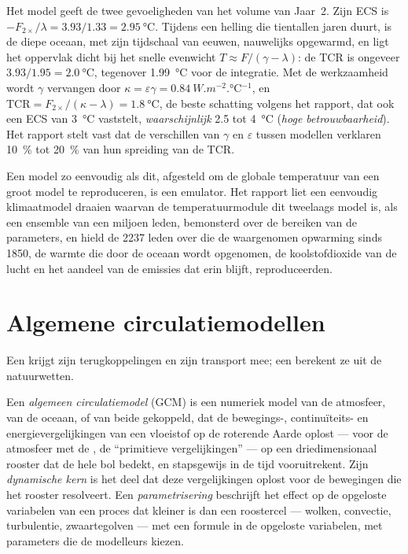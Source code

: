 Het model geeft de twee gevoeligheden van het volume van Jaar~2. Zijn ECS is
$-F_{2\times}/\lambda = 3.93/1.33 = \qty{2.95}{\celsius}$. Tijdens een helling
die tientallen jaren duurt, is de diepe oceaan, met zijn tijdschaal van eeuwen, nauwelijks
opgewarmd, en ligt het oppervlak dicht bij het snelle evenwicht $T \approx F/(\gamma -
\lambda)$: de TCR is ongeveer $3.93/1.95 = \qty{2.0}{\celsius}$, tegenover
\qty{1.99}{\celsius} voor de integratie. Met de werkzaamheid wordt $\gamma$ vervangen
door $\kappa = \varepsilon\gamma = \qty{0.84}{W.m^{-2}.\celsius^{-1}}$,
en $\text{TCR} = F_{2\times}/(\kappa - \lambda) = \qty{1.8}{\celsius}$,
de beste schatting volgens het rapport, dat ook een ECS van
\qty{3}{\celsius} vaststelt, \emph{waarschijnlijk} 2.5 tot \qty{4}{\celsius} (\emph{hoge
betrouwbaarheid}). Het rapport stelt vast dat de verschillen van $\gamma$ en
$\varepsilon$ tussen modellen verklaren \qty{10}{\percent} tot \qty{20}{\percent} van hun
spreiding van de TCR.

Een model zo eenvoudig als dit, afgesteld om de globale temperatuur van een groot
model te reproduceren, is een emulator. Het rapport liet een eenvoudig klimaatmodel draaien waarvan de temperatuurmodule
dit tweelaags model is, als een ensemble van een miljoen leden, bemonsterd over de
bereiken van de parameters, en hield de 2237 leden over die de waargenomen
opwarming sinds 1850, de warmte die door de oceaan wordt opgenomen, de
koolstofdioxide van de lucht en het aandeel van de emissies dat erin blijft, reproduceerden.

\section{Algemene circulatiemodellen}\label{sec:b3:climate-models:gcm}

Een  krijgt zijn terugkoppelingen en zijn transport mee; een
 berekent ze uit de natuurwetten.

\begin{definition}\label{def:b3:climate-models:gcm}
Een \emph{algemeen circulatiemodel} (GCM)
is een numeriek model van de atmosfeer, van de oceaan, of van beide gekoppeld,
dat de bewegings-, continuïteits- en energievergelijkingen van een vloeistof op
de roterende Aarde oplost --- voor de atmosfeer met de , de ``primitieve vergelijkingen'' --- op een driedimensionaal
rooster dat de hele bol bedekt, en stapsgewijs in de tijd vooruitrekent. Zijn \emph{dynamische
kern} is het deel dat deze vergelijkingen
oplost voor de bewegingen die het rooster resolveert. Een
\emph{parametrisering} beschrijft het effect op de
opgeloste variabelen van een proces dat kleiner is dan een roostercel --- wolken,
convectie, turbulentie, zwaartegolven --- met een formule in de opgeloste
variabelen, met parameters die de modelleurs kiezen.
\end{definition}

